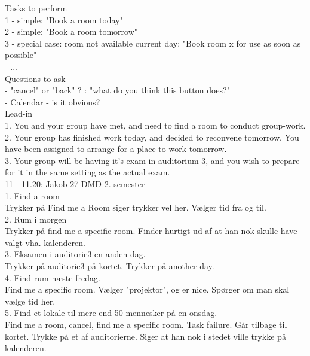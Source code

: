 Tasks to perform\\
1 - simple: "Book a room today" \\
2 - simple: "Book a room tomorrow" \\
3 - special case: room not available current day: "Book room x for use as soon as possible" \\
- ... \\


Questions to ask \\
- "cancel" or "back" ? : "what do you think this button does?" \\
- Calendar - is it obvious? \\


Lead-in \\
1.
You and your group have met, and need to find a room to conduct group-work.\\

2.
Your group has finished work today, and decided to reconvene tomorrow. You have been assigned to arrange for a place to work tomorrow.\\

3.
Your group will be having it's exam in auditorium 3, and you wish to prepare for it in the same setting as the actual exam. \\


11 - 11.20:	Jakob 27 DMD 2. semester\\



1. Find a room\\
Trykker på Find me a Room \- siger trykker vel her.
Vælger tid fra og til.\\


2. Rum i morgen\\
Trykker på find me a specific room. Finder hurtigt ud af at han nok skulle have valgt vha. kalenderen.\\


3. Eksamen i auditorie3 en anden dag.\\
Trykker på auditorie3 på kortet. Trykker på another day. \\


4. Find rum næste fredag.\\
Find me a specific room. Vælger "projektor", og er nice. Spørger om man skal vælge tid her.\\

5. Find et lokale til mere end 50 mennesker på en onsdag.\\
Find me a room, cancel, find me a specific room. Task failure. Går tilbage til kortet. Trykke på et af auditorierne. Siger at han nok i stedet ville trykke på kalenderen. \\


